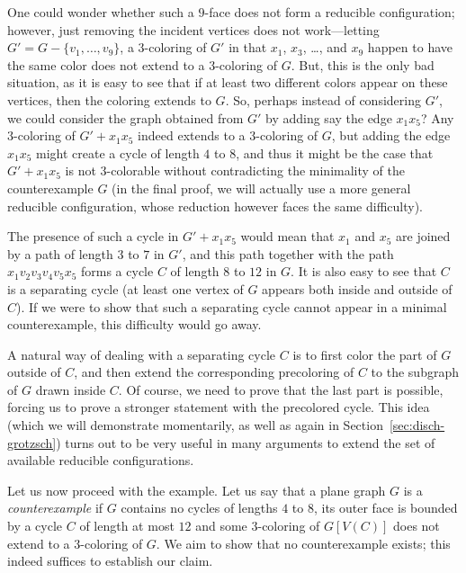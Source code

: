 \documentclass[12pt,twoside,openright,a4paper]{book}
\begin{document}
One could wonder whether such a $9$-face does not
form a reducible configuration; however, just removing the incident vertices does not work---letting $G'=G-\{v_1,\ldots, v_9\}$,
a $3$-coloring of $G'$ in that $x_1$, $x_3$, \ldots, and $x_9$ happen to have the same color does not extend to
a $3$-coloring of $G$.  But, this is the only bad situation, as it is easy to see that if at least two different colors
appear on these vertices, then the coloring extends to $G$.  So, perhaps instead of considering $G'$, we could
consider the graph obtained from $G'$ by adding say the edge $x_1x_5$?  Any $3$-coloring of $G'+x_1x_5$ indeed extends to
a $3$-coloring of $G$, but adding the edge $x_1x_5$ might create a cycle of length $4$ to $8$, and thus
it might be the case that $G'+x_1x_5$ is not $3$-colorable without contradicting the minimality of the counterexample $G$
(in the final proof, we will actually use a more general reducible configuration, whose reduction however faces the
same difficulty).

The presence of such a cycle in $G'+x_1x_5$ would mean that $x_1$ and $x_5$ are joined by a path of length $3$ to $7$ in $G'$,
and this path together with the path $x_1v_2v_3v_4v_5x_5$ forms a cycle $C$ of length $8$ to $12$ in $G$.  It is also
easy to see that $C$ is a separating cycle (at least one vertex of $G$ appears both inside and outside of $C$).
If we were to show that such a separating cycle cannot appear in a minimal counterexample, this difficulty would go away.

A natural way of dealing with a separating cycle $C$ is to first color the part of $G$ outside of $C$, and then
extend the corresponding precoloring of $C$ to the subgraph of $G$ drawn inside $C$.
Of course, we need to prove that the last part is possible, forcing us to prove
a stronger statement with the precolored cycle.  This idea (which we will demonstrate momentarily, as well
as again in Section~\ref{sec:disch-grotzsch}) turns out to be very useful in many arguments to extend
the set of available reducible configurations.

Let us now proceed with the example.  Let us say that a plane graph $G$ is a \emph{counterexample}
if $G$ contains no cycles of lengths $4$ to $8$, its outer face is bounded
by a cycle $C$ of length at most $12$ and some $3$-coloring of $G[V(C)]$ does not extend to a $3$-coloring of $G$.
We aim to show that no counterexample exists; this indeed suffices to establish our claim.
\end{document}
